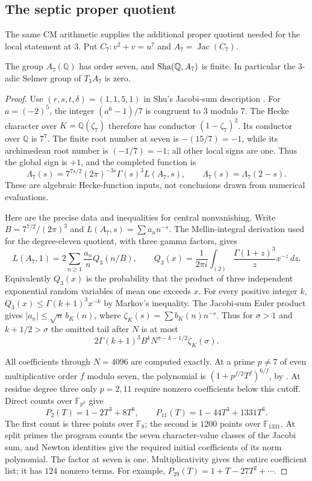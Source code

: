 \subsection{The septic proper quotient}

The same CM arithmetic supplies the additional proper quotient needed
for the local statement at $3$.
Put $C_7:v^2+v=u^7$ and $A_7=\operatorname{Jac}(C_7)$.
\begin{proposition}\label{prop:septic}
The group $A_7(\mathbb Q)$ has order seven, and
$\operatorname{Sha}(\mathbb Q,A_7)$ is finite. In particular the $3$-adic Selmer group
of $T_3A_7$ is zero.
\end{proposition}
\begin{proof}
Use $(r,s,t,\delta)=(1,1,5,1)$ in Shu's Jacobi-sum description
\citep[\S\S2.1--2.2, pp.~5--6; Proposition 3.12(2), p.~16;
Theorem 3.13, pp.~17--18]{ShuExpanded2021}.
For $a=(-2)^5$, the integer $(a^6-1)/7$ is congruent to $3$ modulo
$7$. The Hecke character over $K=\mathbb Q(\zeta_7)$ therefore has
conductor $(1-\zeta_7)^2$. Its conductor over $\mathbb Q$ is $7^7$.
The finite root number at seven is $-\left(15/7\right)=-1$, while
its archimedean root number is $\left(-1/7\right)=-1$; all other
local signs are one. Thus the global sign is $+1$, and the completed
function is
\[
 \Lambda_7(s)=7^{7s/2}(2\pi)^{-3s}\Gamma(s)^3L(A_7,s),
 \qquad \Lambda_7(s)=\Lambda_7(2-s).
\]
These are algebraic Hecke-function inputs, not conclusions drawn from
numerical evaluations.

Here are the precise data and inequalities for central nonvanishing.
Write $B=7^{7/2}/(2\pi)^3$ and $L(A_7,s)=\sum a_nn^{-s}$.
The Mellin-integral derivation used for the degree-eleven quotient,
with three gamma factors, gives
\[
 L(A_7,1)=2\sum_{n\ge1}\frac{a_n}{n}Q_3(n/B),\qquad
 Q_3(x)=\frac1{2\pi i}\int_{(2)}
                   \frac{\Gamma(1+z)^3}{z}x^{-z}\,dz.
\]
Equivalently $Q_3(x)$ is the probability that the product of three
independent exponential random variables of mean one exceeds $x$.
For every positive integer $k$,
$Q_3(x)\le\Gamma(k+1)^3x^{-k}$ by Markov's inequality.
The Jacobi-sum Euler product gives
$|a_n|\le \sqrt n\,b_K(n)$, where
$\zeta_K(s)=\sum b_K(n)n^{-s}$.
Thus for $\sigma>1$ and $k+1/2>\sigma$ the omitted tail after $N$ is
at most
\[
 2\Gamma(k+1)^3 B^k N^{\sigma-k-1/2}\zeta_K(\sigma).
\]

All coefficients through $N=4096$ are computed exactly. At a prime
$p\ne7$ of even multiplicative order $f$ modulo seven, the polynomial
is $(1+p^{f/2}T^f)^{6/f}$, by
\citet[Lemma 1.1, p.~203]{GrossRohrlich1978}.
At residue degree three only $p=2,11$ require nonzero coefficients
below this cutoff. Direct counts over $\mathbb F_{p^3}$ give
\[
 P_2(T)=1-2T^3+8T^6,\qquad
 P_{11}(T)=1-44T^3+1331T^6.
\]
The first count is three points over $\mathbb F_8$; the second is
$1200$ points over $\mathbb F_{1331}$. At split primes the program
counts the seven character-value classes of the Jacobi sum, and
Newton identities give the required initial coefficients of its norm
polynomial. The factor at seven is one. Multiplicativity gives the
entire coefficient list; it has $124$ nonzero terms. For example,
$P_{29}(T)=1+T-27T^2+\cdots$.


\end{proof}
